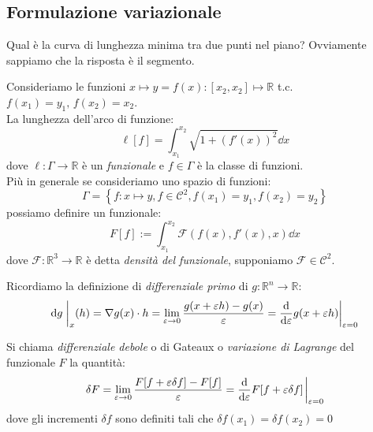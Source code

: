 \subsection{Formulazione variazionale}
\begin{example}
    Qual è la curva di lunghezza minima tra due punti nel piano? Ovviamente sappiamo che la risposta è il segmento.
\end{example}
Consideriamo le funzioni $x\mapsto y= f(x):[x_2,x_2]\mapsto \mathbb{R}$ t.c. $f(x_1)=y_1, \,f(x_2)=x_2$.\\
La lunghezza dell'arco di funzione:
\begin{equation}
    \ell[f]=\int_{x_1}^{x_2}\sqrt{1+(f'(x))^2}\dd{x}            
\end{equation}
dove $\ell: \Gamma\rightarrow \mathbb{R}$ è un \textit{funzionale} e $f\in\Gamma$ è la classe di funzioni.\\
Più in generale se consideriamo uno spazio di funzioni:
\begin{equation}
    \Gamma= \left\{ f: x\mapsto y , f\in \mathcal{C}^2, f(x_1)=y_1, f(x_2)= y_2 \right\}
\end{equation}
possiamo definire un funzionale:
\begin{equation}
    F[f ]:= \int_{x_1}^{x_2}\mathcal{F}(f(x),f'(x),x)\dd{x}
\end{equation}
dove $\mathcal{F}:\mathbb{R}^3\rightarrow \mathbb{R}$ è detta \textit{densità del funzionale}, supponiamo $\mathcal{F}\in \mathcal{C}^2$.

\begin{remark}
    Ricordiamo la definizione di \textit{differenziale primo} di $g: \mathbb{R}^n \rightarrow \mathbb{R}$:
    \begin{equation}
        \dd{g}\eval_{x}(h) =\nabla g(x)\cdot h = \lim_{\varepsilon \to 0} \frac{g(x + \varepsilon h) - g(x)}{\varepsilon} 
        = \dv{\varepsilon} g(x + \varepsilon h)\bigg|_{\varepsilon = 0}
    \end{equation}
\end{remark}

\begin{definition}
    Si chiama \textit{differenziale debole} o di Gateaux o \textit{variazione di Lagrange} del funzionale $F $ la quantità:
    \begin{equation}
        \delta F = \lim_{\varepsilon\to 0}\frac{F[f+\varepsilon\delta f]-F[f]}{\varepsilon}= \dv{\varepsilon} F[f+\varepsilon\delta f ]\eval_{\varepsilon=0}
    \end{equation}
    dove gli incrementi $\delta f $ sono definiti tali che $\delta f(x_1)= \delta f(x_2)=0$
\end{definition}

